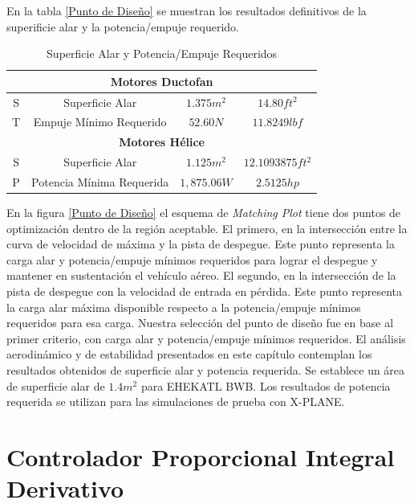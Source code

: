 En la tabla \ref{Punto de Diseño} se muestran los resultados definitivos de la superificie alar y la potencia/empuje requerido. 

\begin{table}[!h]
    \label{superficie alar y potencia/empuje requeridos para EHEKATL BWB}
    \caption{Superficie Alar y Potencia/Empuje Requeridos}
    \centering
    \begin{tabular}{|c|c|c|c|}
    \hline
    \multicolumn{4}{|c|}{\textbf{Motores Ductofan}} \\
    \hline
      S   &  Superficie Alar & $1.375 m^2$ & $14.80 ft^2$ \\
     T    & Empuje Mínimo Requerido & $52.60N$ & $11.8249 lbf$ \\
     \hline
     \multicolumn{4}{|c|}{\textbf{Motores Hélice}} \\
     \hline
     S   &  Superficie Alar & $1.125 m^2$ & $12.1093875 ft^2$ \\
     P   & Potencia Mínima Requerida & $1,875.06 W$ & $2.5125 hp$ \\
     \hline
    \end{tabular}
\end{table}

En la figura \ref{Punto de Diseño} el esquema de \textit{Matching Plot} tiene dos puntos de optimización dentro de la región aceptable.
%
El primero, en la intersección entre la curva de velocidad de máxima y la pista de despegue. Este punto representa la carga alar y potencia/empuje mínimos requeridos para lograr el despegue y mantener en sustentación el vehículo aéreo. 
%
El segundo, en la intersección de la pista de despegue con la velocidad de entrada en pérdida. Este punto representa la carga alar máxima disponible respecto a la potencia/empuje mínimos requeridos para esa carga.
%
Nuestra selección del punto de diseño fue en base al primer criterio, con carga alar y potencia/empuje mínimos requeridos. 
%
El análisis aerodinámico y de estabilidad presentados en este capítulo contemplan los resultados obtenidos de superficie alar y potencia requerida. 
Se establece un área de superficie alar de $1.4m^2$ para EHEKATL BWB. 
%
Los resultados de potencia requerida se utilizan para las simulaciones de prueba con X-PLANE. 


\section{Controlador Proporcional Integral Derivativo}

